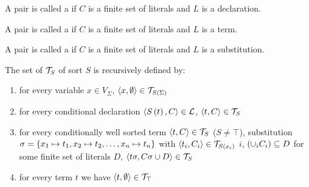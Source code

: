 \begin{defi}
A pair  is called a  if $C$ is a finite set of literals and $L$ is a declaration.
\cite{conf/ijcai/Weidenbach93}
\end{defi}

\begin{defi}
A pair  is called a  if $C$ is a finite set of literals and $L$ is a term.
\cite{conf/ijcai/Weidenbach93}
\end{defi}

\begin{defi}
A pair  is called a  if $C$ is a finite set of literals and $L$ is a substitution.
\cite{conf/ijcai/Weidenbach93}
\end{defi}

\begin{defi}
The set of  $\mathcal{T}_S$ of sort $S$ is recursively defined by:
\begin{enumerate}
 \item for every variable $x\in V_{\Sigma}$, $\left\langle x,\emptyset\right\rangle\in\mathcal{T}_{S\left(\Sigma\right)}$
 \item for every conditional declaration $\left\langle S\left(t\right),C\right\rangle\in\mathcal{L}$, $\left\langle t,C\right\rangle\in\mathcal{T}_S$
 \item for every conditionally well sorted term $\left\langle t,C\right\rangle\in\mathcal{T}_S$ ($S\neq\top$), substitution $\sigma=\left\{ x_1\mapsto t_1,x_2\mapsto t_2,\ldots,x_n\mapsto t_n\right\}$ with $\left\langle t_i,C_i\right\rangle\in\mathcal{T}_{S\left(x_i\right)}$ \faTx{} $i$, $\left( \displaystyle\cup_iC_i\right)\subseteq D$ for some finite set of literals $D$, $\left\langle t\sigma,C\sigma\cup D\right\rangle\in\mathcal{T}_S$
 \item for every term $t$ we have $\left\langle t,\emptyset\right\rangle\in\mathcal{T}_{\top}$
\end{enumerate}
\cite{conf/ijcai/Weidenbach93}
\end{defi}

